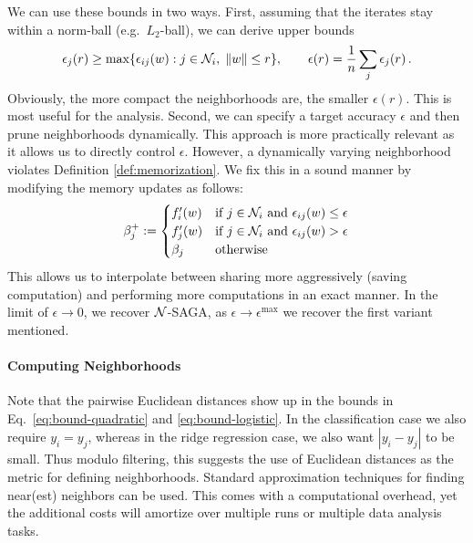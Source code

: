 We can use these bounds in two ways. First, assuming that the iterates stay within a norm-ball (e.g.~$L_2$-ball), we can derive upper bounds
\begin{align}
\epsilon_j(r) \ge  \max\{ \epsilon_{ij}(w): j \in {\cal N}_i, \; \|w\| \le r\}, \qquad \epsilon(r) = \frac 1n \sum_{j} \epsilon_j(r)\,. 
\end{align}
Obviously, the more compact the neighborhoods are, the smaller $\epsilon(r)$. This is most useful for the analysis. 
%
 Second, we can specify a target accuracy $\epsilon$ and then prune neighborhoods dynamically. This approach is more practically relevant as it allows us to directly control $\epsilon$. However, a dynamically varying neighborhood violates Definition \ref{def:memorization}. We fix this in a sound manner by modifying the memory updates as follows:
 \begin{align}
\beta^+_j := \begin{cases} 
f'_i(w) & \text{if $j \in  {\cal N}_i$ and $\epsilon_{ij}(w) \le \epsilon$} \\
f'_j(w) & \text{if $j \in  {\cal N}_i$ and $\epsilon_{ij}(w) > \epsilon$} \\
\beta_j & \text{otherwise}
\end{cases}
\label{eq:en-saga}
 \end{align}
This allows us to interpolate between sharing more aggressively (saving computation) and performing more computations in an exact manner. In the limit of $\epsilon \to 0$, we  recover ${\cal N}$-SAGA, as $\epsilon \to \epsilon^{\max}$ we recover the first variant mentioned. 
%
%
 
\paragraph*{Computing Neighborhoods}

Note that the pairwise Euclidean distances show up in the bounds in Eq.~\eqref{eq:bound-quadratic} and \eqref{eq:bound-logistic}. In the classification case we also require $y_i = y_j$, whereas in the ridge regression case, we also want $| y_i - y_j|$ to be small. Thus modulo filtering, this suggests the use of Euclidean distances as the metric for defining neighborhoods. Standard approximation techniques for finding near(est) neighbors can be used. This comes with a computational overhead, yet the additional costs will amortize over multiple runs or multiple data analysis tasks.

%


